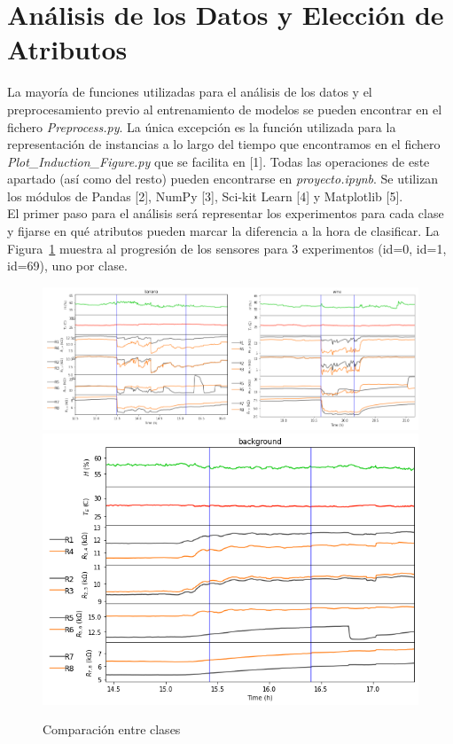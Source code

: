 \documentclass{esannV2}
\begin{document}
\section{Análisis  de los Datos y Elección de Atributos}
La mayoría de funciones utilizadas para el análisis de los datos y el preprocesamiento previo al entrenamiento de modelos se pueden encontrar en el fichero \textit{Preprocess.py}. La única excepción es la función utilizada para la representación de instancias a lo largo del tiempo que encontramos en el fichero \\ \textit{Plot\_Induction\_Figure.py} que se facilita en [1]. Todas las operaciones de este apartado (así como del resto) pueden encontrarse en \textit{proyecto.ipynb}. Se utilizan los módulos de Pandas [2], NumPy [3], Sci-kit Learn [4] y Matplotlib [5]. \\
El primer paso para el análisis será representar los experimentos para cada clase y fijarse en qué atributos pueden marcar la diferencia a la hora de clasificar. La Figura~\ref{fig:banvswinvsbck} muestra al progresión de los sensores para 3 experimentos (id=0, id=1, id=69), uno por clase. \\

\begin{figure}[b!]
\includegraphics[scale=0.35]{img/banvswin.png}
\centering
\includegraphics[scale=0.3]{img/background_69.png}
\caption{Comparación entre clases}\label{fig:banvswinvsbck}
\end{figure}
\end{document}
